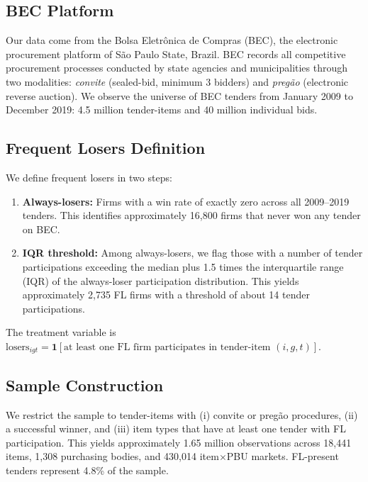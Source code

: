 \documentclass[12pt]{elsarticle}
\begin{document}
\subsection{BEC Platform}

Our data come from the Bolsa Eletr\^{o}nica de Compras (BEC), the electronic procurement platform of S\~{a}o Paulo State, Brazil. BEC records all competitive procurement processes conducted by state agencies and municipalities through two modalities: \textit{convite} (sealed-bid, minimum 3 bidders) and \textit{preg\~{a}o} (electronic reverse auction). We observe the universe of BEC tenders from January 2009 to December 2019: 4.5 million tender-items and 40 million individual bids.

\subsection{Frequent Losers Definition}

We define frequent losers in two steps:

\begin{enumerate}
\item \textbf{Always-losers:} Firms with a win rate of exactly zero across all 2009--2019 tenders. This identifies approximately 16,800 firms that never won any tender on BEC.

\item \textbf{IQR threshold:} Among always-losers, we flag those with a number of tender participations exceeding the median plus 1.5 times the interquartile range (IQR) of the always-loser participation distribution. This yields approximately 2,735 FL firms with a threshold of about 14 tender participations.
\end{enumerate}

The treatment variable is $\text{losers}_{igt} = \mathbf{1}[\text{at least one FL firm participates in tender-item } (i,g,t)]$.

\subsection{Sample Construction}

We restrict the sample to tender-items with (i) convite or preg\~{a}o procedures, (ii) a successful winner, and (iii) item types that have at least one tender with FL participation. This yields approximately 1.65 million observations across 18,441 items, 1,308 purchasing bodies, and 430,014 item$\times$PBU markets. FL-present tenders represent 4.8\% of the sample.
\end{document}
